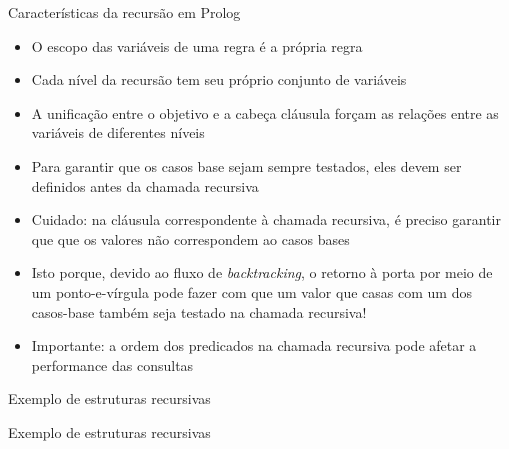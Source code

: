 \begin{frame}[fragile]{Características da recursão em Prolog}

    \begin{itemize}
        \item O escopo das variáveis de uma regra é a própria regra

        \item Cada nível da recursão tem seu próprio conjunto de variáveis

        \item A unificação entre o objetivo e a cabeça cláusula forçam as relações entre as 
            variáveis de diferentes níveis

        \item Para garantir que os casos base sejam sempre testados, eles devem ser definidos 
            antes da chamada recursiva

        \item Cuidado: na cláusula correspondente à chamada recursiva, é preciso garantir que
            que os valores não correspondem ao casos bases

        \item Isto porque, devido ao fluxo de \textit{backtracking}, o retorno à porta
             por meio de um ponto-e-vírgula pode fazer com que um valor
            que casas com um dos casos-base também seja testado na chamada recursiva!
            
        \item Importante: a ordem dos predicados na chamada recursiva pode afetar a 
            performance das consultas

    \end{itemize}

\end{frame}

\begin{frame}[fragile]{Exemplo de estruturas recursivas}


\end{frame}

\begin{frame}[fragile]{Exemplo de estruturas recursivas}


\end{frame}
